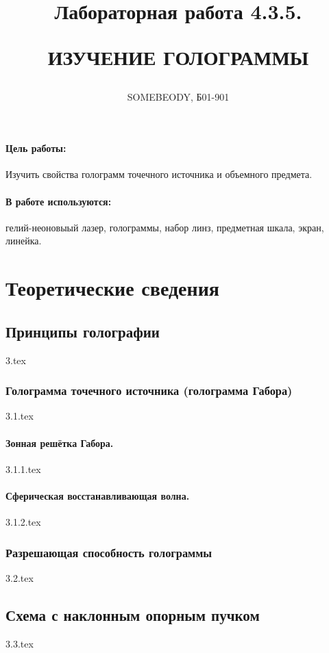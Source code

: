 \documentclass[a5paper,10pt, twoside]{article} %
\title
{
\hfill \break	\hfill \break
\hfill \break	\hfill \break
Лабораторная работа 4.3.5.

ИЗУЧЕНИЕ ГОЛОГРАММЫ
}
\author{SOMEBEODY, Б01-901}
\begin{document}
\maketitle


\thispagestyle{empty} %

\newpage

\tableofcontents %

\newpage


\paragraph{Цель работы:}

Изучить свойства голограмм точечного источника и объемного предмета.

\paragraph{В работе используются:}

гелий-неоновыый лазер, голограммы, набор линз, предметная шкала, экран, линейка.

\section{Теоретические сведения}

  \subsection{Принципы голографии}
  {3.tex}

    \subsubsection{Голограмма точечного источника (голограмма Габора)}
    {3.1.tex}

      \paragraph{Зонная решётка Габора.}
      {3.1.1.tex}

      \paragraph{Сферическая восстанавливающая волна.}
      {3.1.2.tex}
    
    \subsubsection{Разрешающая способность голограммы}
    {3.2.tex}

    \subsection{Схема с наклонным опорным пучком}
    {3.3.tex}
\end{document}
